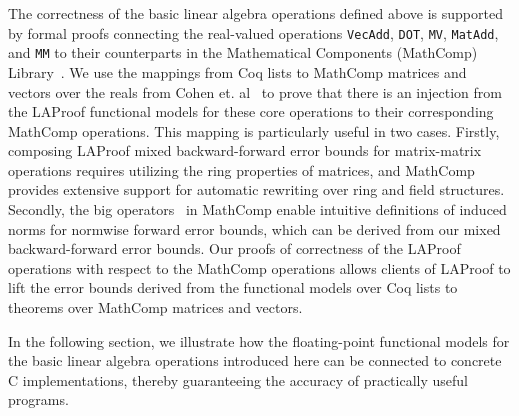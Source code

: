  The correctness of the basic linear algebra operations defined 
 above is supported by formal proofs connecting the real-valued 
 operations \lstinline{VecAdd}, \lstinline{DOT}, 
 \lstinline{MV}, \lstinline{MatAdd}, and \lstinline{MM} to 
 their counterparts in the Mathematical Components (MathComp) 
 Library~\cite{mathcomp}. We use the mappings from Coq lists to 
 MathComp matrices and vectors over the reals from Cohen et. 
 al~\cite{cohen2022} to prove that there is an injection from 
 the LAProof functional models for these core operations to 
 their corresponding MathComp operations. This 
 mapping is particularly useful in two cases. Firstly,  
 composing LAProof mixed backward-forward error bounds for 
 matrix-matrix operations requires utilizing the ring 
 properties of matrices, and MathComp provides extensive 
 support for automatic rewriting over ring and field 
 structures. Secondly, the big operators~\cite{bigops} in 
 MathComp enable intuitive definitions of induced norms for 
 normwise forward error bounds, which can be derived from our 
 mixed backward-forward error bounds. Our proofs of correctness 
 of the LAProof operations with respect to the MathComp 
 operations allows clients of LAProof to lift the error bounds 
 derived from the 
 functional models over Coq lists to theorems over MathComp 
 matrices and vectors. 

In the following section, we illustrate how the floating-point functional models  for the basic linear algebra operations introduced here can be connected to concrete C implementations, thereby guaranteeing the accuracy of practically useful programs.
